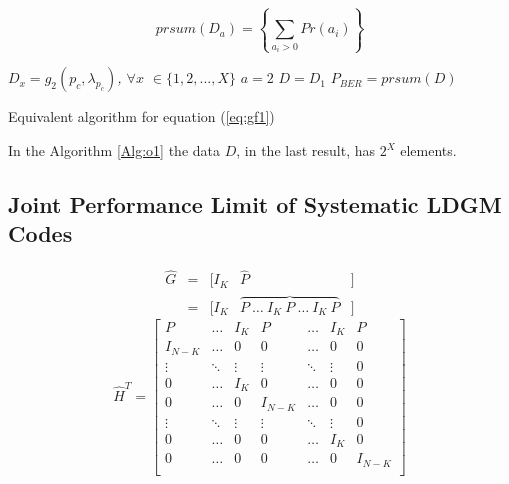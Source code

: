 \documentclass[journal]{IEEEtran}
\begin{document}
\begin{equation}\label{eq:alg4}
 prsum(D_a)=\left \{  \sum_{a_i>0} Pr(a_i)\right \}
\end{equation}
\begin{algorithm}
\label{Alg:o1}
 \BlankLine
 \emph{$D_x=g_2(p_c, \lambda_{p_c})$, $\forall x$ $\in \{1, 2, ..., X\}$}\;
 \emph{$a=2$}\;
 \emph{$D=D_1$}\; 
 \emph{$P_{BER}=prsum(D)$}\; 
 \caption{Equivalent algorithm for equation (\ref{eq:gf1})}
\end{algorithm}

In the Algorithm \ref{Alg:o1} the data $D$, in the last result, has $2^X$ elements.
\subsection{Joint Performance Limit of Systematic LDGM Codes}

 \begin{equation}\label{eq:hG}
 \begin{matrix}
\hat{G} & = & [I_K & \hat{P} & ]\\
~       & = & [I_K & \overbrace{P ~ \dots ~ I_K ~ P ~ \dots  ~ I_K ~ P} & ]
\end{matrix}
\end{equation}
 \begin{equation}\label{eq:hH}
\hat{H}^T=\left[ \begin{matrix}
P       & \dots  & I_K    & P       & \dots  & I_K    & P       \\
I_{N-K} & \dots  & 0      & 0       & \dots  & 0      & 0       \\
\vdots  & \ddots & \vdots & \vdots  & \ddots & \vdots & 0       \\
0       & \dots  & I_K    & 0       & \dots  & 0      & 0       \\
0       & \dots  & 0      & I_{N-K} & \dots  & 0      & 0       \\
\vdots  & \ddots & \vdots & \vdots  & \ddots & \vdots & 0       \\
0       & \dots  & 0      & 0       & \dots  & I_K    & 0       \\
0       & \dots  & 0      & 0       & \dots  & 0      & I_{N-K} \\
\end{matrix} \right]
\end{equation}
\end{document}
